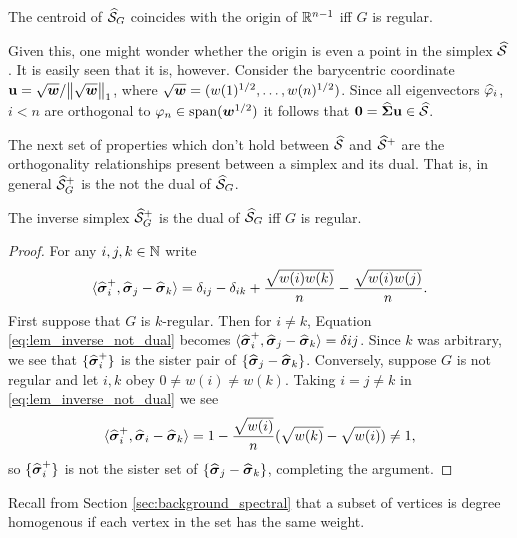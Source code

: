 \begin{lemma}
	\label{lem:centroid_normalized}
	The centroid of $\widehat{\mathcal{S}}_G$ coincides with the origin of $\mathbb{R}^{n-1}$ iff $G$ is regular. 
\end{lemma}

Given this, one might wonder whether the origin is even a point in the simplex $\widehat{\mathcal{S}}$. It is easily seen that it is, however. Consider the barycentric coordinate $\vb{u} = \sqrt{\vb*{w}}/\norm{\sqrt{\vb*{w}}}_1$, where $\sqrt{\vb*{w}}=(w(1)^{1/2}, \dots, w(n)^{1/2})$. Since all eigenvectors $\widehat{\varphi}_i$, $i<n$ are orthogonal to $\varphi_n \in\textnormal{span}(\vb*{w}^{1/2})$ it follows that $\vb{0} = \widehat{\boldsymbol{\Sigma}}\vb{u}\in\widehat{\mathcal{S}}$. 

The next set of properties which don't hold between $\widehat{\mathcal{S}}$ and $\widehat{\mathcal{S}}^+$ are the orthogonality relationships present between a simplex and its dual. That is, in general $\widehat{\mathcal{S}}^+_G$ is the not the dual of $\widehat{\mathcal{S}}_G$. 

\begin{lemma}
	\label{lem:inverse_not_dual}
	The inverse simplex $\widehat{\mathcal{S}}_G^+$ is the dual of $\widehat{\mathcal{S}}_G$ iff $G$ is regular. 
\end{lemma}
\begin{proof}
	For any $i,j,k\in\mathbb{N}$ write 
	\begin{equation}
	\label{eq:lem_inverse_not_dual}
	\langle \widehat{\vb*{\sigma}}_i^+,\widehat{\vb*{\sigma}}_j-\widehat{\vb*{\sigma}}_k\rangle = \delta_{ij} - \delta_{ik} + \frac{\sqrt{w(i)w(k)}}{n} - \frac{\sqrt{w(i)w(j)}}{n}.
	\end{equation}
	First suppose that $G$ is $k$-regular. Then for $i\neq k$, Equation \eqref{eq:lem_inverse_not_dual} becomes $\langle \widehat{\vb*{\sigma}}_i^+,\widehat{\vb*{\sigma}}_j-\widehat{\vb*{\sigma}}_k\rangle = \delta{ij}$. Since $k$ was arbitrary, we see that $\{\widehat{\vb*{\sigma}}_i^+\}$ is the sister pair of $\{\widehat{\vb*{\sigma}}_j-\widehat{\vb*{\sigma}}_k\}$. Conversely, suppose $G$ is not regular and let $i,k$ obey $0\neq w(i)\neq w(k)$. Taking $i=j\neq k$ in \eqref{eq:lem_inverse_not_dual} we see 
	\[\langle \widehat{\vb*{\sigma}}_i^+,\widehat{\vb*{\sigma}}_i-\widehat{\vb*{\sigma}}_k\rangle = 1 - \frac{\sqrt{w(i)}}{n}(\sqrt{w(k)}-\sqrt{w(i)})\neq 1,\]
	so $\{\widehat{\vb*{\sigma}}_i^+\}$ is not the sister set of $\{\widehat{\vb*{\sigma}}_j-\widehat{\vb*{\sigma}}_k\}$, completing the argument. 
\end{proof}


Recall from Section \ref{sec:background_spectral} that a subset of vertices is degree homogenous if each vertex in the set has the same weight. 

